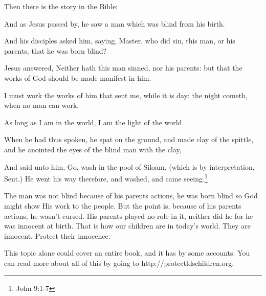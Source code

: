 Then there is the story in the Bible:

\begin{displayquote}
And as Jesus passed by, he saw a man which was blind from his birth.

And his disciples asked him, saying, Master, who did sin, this man, or his parents, 
that he was born blind?

Jesus answered, Neither hath this man sinned, nor his parents: but that the works of 
God should be made manifest in him.

I must work the works of him that sent me, while it is day: the night cometh, 
when no man can work.

As long as I am in the world, I am the light of the world.

When he had thus spoken, he spat on the ground, and made clay of the spittle, 
and he anointed the eyes of the blind man with the clay,

And said unto him, Go, wash in the pool of Siloam, (which is by interpretation, 
  Sent.) He went his way therefore, and washed, and came seeing.\footnote{John 9:1-7}
\end{displayquote}

The man was not blind because of his parents actions, he was born blind so God might
show His work to the people. But the point is, because of his parents actions, he
wasn't cursed. His parents played no role in it, neither did he for he was innocent
at birth. That is how our children are in today's world. They are innocent. Protect
their innocence.

This topic alone could cover an entire book, and it has by some accounts. You can
read more about all of this by going to http://protectldschildren.org.
